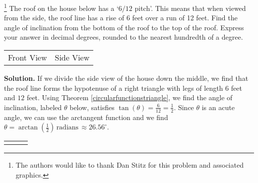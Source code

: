 \documentclass[12pt]{ximera}
\begin{document}
\begin{example}\footnote{The authors would like to thank Dan Stitz for this problem and associated graphics.} \label{roofpitchex}  The roof on the house below has a  `$6/12$ pitch'.  This means that when viewed from the side, the roof line has a rise of 6 feet over a run of 12 feet.  Find the angle of inclination from the bottom of the roof to the top of the roof.  Express your answer in decimal degrees, rounded to the nearest hundredth of a degree.

\begin{center}

\begin{tabular}{cc}

Front View &  \hspace{0.75in} Side View \\

\end{tabular} 

\end{center}

{\bf Solution.} If we divide the side view of the house down the middle, we find that the roof line forms the hypotenuse of a right triangle with legs of length $6$ feet and $12$ feet.  Using Theorem \ref{circularfunctionstriangle}, we find the angle of inclination, labeled $\theta$ below, satisfies $\tan(\theta) = \frac{6}{12} = \frac{1}{2}$.  Since $\theta$ is an acute angle, we can use the arctangent function and we find $\theta = \arctan\left(\frac{1}{2}\right)\, \text{radians} \, \approx 26.56^{\circ}$.



\begin{tabular}{m{2.5in}m{1in}m{2.5in}}




& 

&

 \\ 

\end{tabular}

\end{example}
\end{document}
